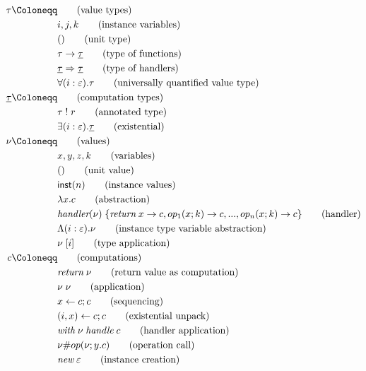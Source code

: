 \begin{align*}
	\ty \Coloneqq 				& 											\tag{value types} \\
									& i, j, k									\tag{instance variables} \\
									& \tunit									\tag{unit type} \\
									& \tarr{\ty}{\cty}						\tag{type of functions} \\
									& \thandler{\cty}{\cty}				\tag{type of handlers} \\
									& \tforall{i}{\eff}{\ty}		\tag{universally quantified value type}\\
	\cty \Coloneqq 			& 											\tag{computation types} \\
									& \aty{\ty}{r}							\tag{annotated type} \\
									& \texists{i}{\eff}{\cty}				\tag{existential} \\
	\val \Coloneqq			&											\tag{values} \\
									& x, y, z, k								\tag{variables} \\
									& \vunit									\tag{unit value} \\
									& \vinst{n}								\tag{instance values} \\
									& \vabs{x}{\comp}					\tag{abstraction} \\
									& \vhandlerci{\val}						\tag{handler} \\
									& \vabst{i}{\eff}{\val}					\tag{instance type variable abstraction} \\
									& \vappt{\val}{i}						\tag{type application} \\
	\comp \Coloneqq		&											\tag{computations} \\
									& \creturn{\val}						\tag{return value as computation} \\
									& \capp{\val}{\val}					\tag{application} \\
									& \cdo{x}{\comp}{\comp}			\tag{sequencing} \\
									& \cunpack{i}{x}{\comp}{\comp}				\tag{existential unpack} \\
									& \chandle{\val}{\comp}			\tag{handler application} \\
									& \copi{\val}{\op}{\val}{y}{\comp}	\tag{operation call} \\
									& \cnew{\eff}							\tag{instance creation} \\
\end{align*}

\newpage
